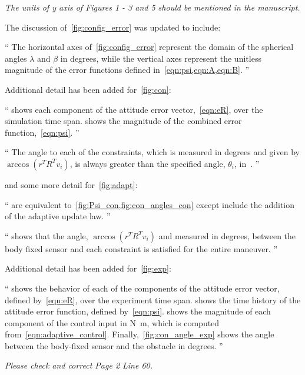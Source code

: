 \documentclass[11pt]{article}
\newenvironment{correction}{\begin{list}{}{\setlength{\leftmargin}{1cm}\setlength{\rightmargin}{1cm}}\vspace{\parsep}\item[]``}{''\end{list}}
\begin{document}
\begin{enumerate}
\item \textit{The units of y axis of Figures 1 - 3 and 5 should be mentioned in the manuscript.}

The discussion of~\cref{fig:config_error} was updated to include:
\begin{correction}
    The horizontal axes of~\cref{fig:config_error} represent the domain of the spherical angles \( \lambda \) and \( \beta \) in degrees, while the vertical axes represent the unitless magnitude of the error functions defined in~\cref{eqn:psi,eqn:A,eqn:B}.    
\end{correction}


Additional detail has been added for~\cref{fig:con}:
\begin{correction}
     shows each component of the attitude error vector,~\cref{eqn:eR}, over the simulation time span.
     shows the  magnitude of the combined error function,~\cref{eqn:psi}.
\end{correction}
\begin{correction}
    The angle to each of the constraints, which is measured in degrees and given by \( \arccos(r^T R^T v_i) \), is always greater than the specified angle, \( \theta_i \), in~.
\end{correction}
and some more detail for~\cref{fig:adapt}:
\begin{correction}
     are equivalent to~\cref{fig:Psi_con,fig:con_angles_con} except include the addition of the adaptive update law.
\end{correction}
\begin{correction}
     shows that the angle, \( \arccos(r^T R^T v_i) \) and measured in degrees, between the body fixed sensor and each constraint is satisfied for the entire maneuver.
\end{correction}

Additional detail has been added for~\cref{fig:exp}:
\begin{correction}
     shows the behavior of each of the components of the attitude error vector, defined by~\cref{eqn:eR}, over the experiment time span.
     shows the time history of the attitude error function, defined by~\cref{eqn:psi}.
     shows the magnitude of each component of the control input in \si{\newton\meter}, which is computed from~\cref{eqn:adaptive_control}.
    Finally,~\cref{fig:con_angle_exp} shows the angle between the body-fixed sensor and the obstacle in degrees.
\end{correction}
\item \textit{Please check and correct Page 2 Line 60.}


\end{enumerate}
\end{document}
